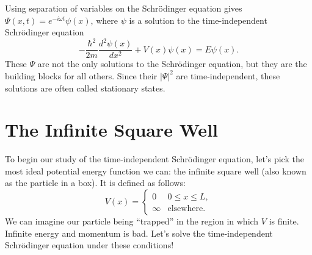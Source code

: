 \documentclass[../p052main.tex]{subfiles}
\begin{document}
\begin{summary}
    Using separation of variables on the Schrödinger equation gives $\Psi(x,t) = e^{-i\omega t} \psi(x)$, where $\psi$ is a solution to the time-independent Schrödinger equation
    \[ -\frac{\hbar^2}{2m} \frac{d^2 \psi(x)}{dx^2} + V(x) \psi(x) = E \psi (x). \]
    These $\Psi$ are not the only solutions to the Schrödinger equation, but they are the building blocks for all others.
    Since their $|\Psi|^2$ are time-independent, these solutions are often called stationary states. 
\end{summary}

\section{The Infinite Square Well}
To begin our study of the time-independent Schrödinger equation, let's pick the most ideal potential energy function we can: the infinite square well (also known as the particle in a box).
It is defined as follows:
\[ V(x) = \begin{cases} 0 & 0 \leq x \leq L, \\ \infty & \text{elsewhere}. \end{cases} \]
We can imagine our particle being ``trapped'' in the region in which $V$ is finite.
Infinite energy and momentum is bad.
Let's solve the time-independent Schrödinger equation under these conditions!
\end{document}
